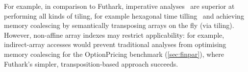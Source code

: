 For example, in comparison to Futhark, imperative
analyses~\cite{InformalTiling,PolyPluto2} are superior at performing
all kinds of tiling, for example hexagonal time
tilling~\cite{HexaTiling} and achieving memory coalescing by
semantically transposing arrays on the fly (via tiling).
%
However, non-affine array indexes may restrict applicability: for
example, indirect-array accesses would prevent traditional analyses
from optimising memory coalescing for the OptionPricing benchmark
(\cref{sec:finpar}), where Futhark's simpler, transposition-based
approach succeeds.

